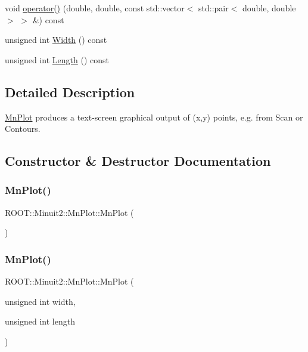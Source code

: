 \begin{DoxyCompactItemize}
\item 
void \mbox{\hyperlink{classROOT_1_1Minuit2_1_1MnPlot_a6cae4ab8961e9f7933320789d101ec1e}{operator()}} (double, double, const std\+::vector$<$ std\+::pair$<$ double, double $>$ $>$ \&) const
\item 
unsigned int \mbox{\hyperlink{classROOT_1_1Minuit2_1_1MnPlot_ae9d97799fcd00d4aa2095884d99dc588}{Width}} () const
\item 
unsigned int \mbox{\hyperlink{classROOT_1_1Minuit2_1_1MnPlot_aefbe338659ecdac9b7ad160472a34221}{Length}} () const
\end{DoxyCompactItemize}


\subsection{Detailed Description}
\mbox{\hyperlink{classROOT_1_1Minuit2_1_1MnPlot}{Mn\+Plot}} produces a text-\/screen graphical output of (x,y) points, e.\+g. from Scan or Contours. 

\subsection{Constructor \& Destructor Documentation}
\mbox{\label{classROOT_1_1Minuit2_1_1MnPlot_af7943a6243c6f1a96083c875d38f749c}} 
\subsubsection{\texorpdfstring{MnPlot()}{MnPlot()}\hspace{0.1cm}{\footnotesize\ttfamily [1/4]}}
{\footnotesize\ttfamily R\+O\+O\+T\+::\+Minuit2\+::\+Mn\+Plot\+::\+Mn\+Plot (\begin{DoxyParamCaption}{ }\end{DoxyParamCaption})\hspace{0.3cm}{\ttfamily [inline]}}

\mbox{\label{classROOT_1_1Minuit2_1_1MnPlot_ae5a2182c4b4922bd53b7cc1fd8293bea}} 
\subsubsection{\texorpdfstring{MnPlot()}{MnPlot()}\hspace{0.1cm}{\footnotesize\ttfamily [2/4]}}
{\footnotesize\ttfamily R\+O\+O\+T\+::\+Minuit2\+::\+Mn\+Plot\+::\+Mn\+Plot (\begin{DoxyParamCaption}\item[{unsigned int}]{width,  }\item[{unsigned int}]{length }\end{DoxyParamCaption})\hspace{0.3cm}{\ttfamily [inline]}}

